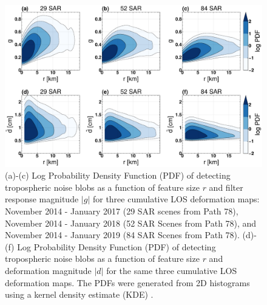 \begin{figure}
	\centering 
	\includegraphics[width=0.9\linewidth]{figures/chapter6-blobs/figure_results_kde.pdf}
	\caption{ (a)-(c) Log Probability Density Function (PDF) of detecting tropospheric noise blobs as a function of feature size $r$ and filter response magnitude $|g|$ for three cumulative LOS deformation maps: November 2014 - January 2017 (29 SAR scenes from Path 78), November 2014 - January 2018 (52 SAR Scenes from Path 78), and November 2014 - January 2019 (84 SAR Scenes from Path 78).
		(d)-(f) Log Probability Density Function (PDF) of detecting tropospheric noise blobs as a function of feature size $r$ and deformation magnitude $|d|$ for the same three cumulative LOS deformation maps.
		The PDFs were generated from 2D histograms using a kernel density estimate (KDE) \cite{Scott2015MultivariateDensityEstimation}.
	}
	\label{fig:results-kde}
\end{figure}

